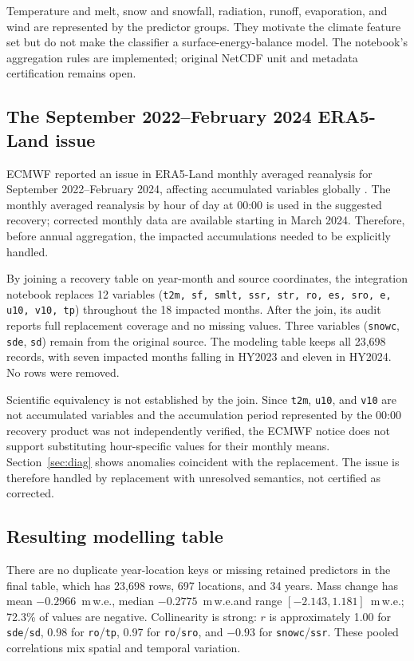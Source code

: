 \documentclass[conference]{IEEEtran}
\newcommand{\mwe}{m\,w.e.}
\begin{document}
Temperature and melt, snow and snowfall, radiation, runoff, evaporation, and wind are represented by the predictor groups. They motivate the climate feature set but do not make the classifier a surface-energy-balance model. The notebook's aggregation rules are implemented; original NetCDF unit and metadata certification remains open.

\subsection{The September 2022--February 2024 ERA5-Land issue}\label{sec:issue}
ECMWF reported an issue in ERA5-Land monthly averaged reanalysis for September 2022--February 2024, affecting accumulated variables globally \cite{ecmwfissue}. The monthly averaged reanalysis by hour of day at 00:00 is used in the suggested recovery; corrected monthly data are available starting in March 2024. Therefore, before annual aggregation, the impacted accumulations needed to be explicitly handled.

By joining a recovery table on year-month and source coordinates, the integration notebook replaces 12 variables (\texttt{t2m, sf, smlt, ssr, str, ro, es, sro, e, u10, v10, tp}) throughout the 18 impacted months. After the join, its audit reports full replacement coverage and no missing values. Three variables (\texttt{snowc}, \texttt{sde}, \texttt{sd}) remain from the original source. The modeling table keeps all 23,698 records, with seven impacted months falling in HY2023 and eleven in HY2024. No rows were removed.

Scientific equivalency is not established by the join. Since \texttt{t2m}, \texttt{u10}, and \texttt{v10} are not accumulated variables and the accumulation period represented by the 00:00 recovery product was not independently verified, the ECMWF notice does not support substituting hour-specific values for their monthly means. Section~\ref{sec:diag} shows anomalies coincident with the replacement. The issue is therefore handled by replacement with unresolved semantics, not certified as corrected.

\subsection{Resulting modelling table}
There are no duplicate year-location keys or missing retained predictors in the final table, which has 23,698 rows, 697 locations, and 34 years. Mass change has mean $-0.2966$~\mwe, median $-0.2775$~\mwe and range $[-2.143,1.181]$~\mwe; 72.3\% of values are negative. Collinearity is strong: $r$ is approximately 1.00 for \texttt{sde}/\texttt{sd}, 0.98 for \texttt{ro}/\texttt{tp}, 0.97 for \texttt{ro}/\texttt{sro}, and $-0.93$ for \texttt{snowc}/\texttt{ssr}. These pooled correlations mix spatial and temporal variation.
\end{document}
